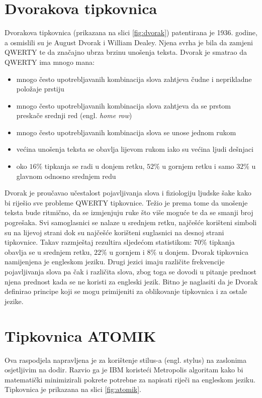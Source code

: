 \documentclass[times, utf8, zavrsni, numeric]{fer}
\begin{document}
\section{Dvorakova tipkovnica}
Dvorakova tipkovnica (prikazana na slici \ref{fig:dvorak}) patentirana je 1936. godine, a osmislili su je August Dvorak i William Dealey. Njena svrha je bila da zamjeni QWERTY te da značajno ubrza brzinu unošenja teksta. Dvorak je smatrao da QWERTY ima mnogo mana:

\begin{itemize}
\item mnogo često upotrebljavanih kombinacija slova zahtjeva čudne i neprikladne položaje prstiju
\item mnogo često upotrebljavanih kombinacija slova zahtjeva da se prstom preskače srednji red (engl. \emph{home row})
\item mnogo često upotrebljavanih kombinacija slova se unose jednom rukom
\item većina unošenja teksta se obavlja lijevom rukom iako su većina ljudi dešnjaci
\item oko $16\%$ tipkanja se radi u donjem retku, $52\%$ u gornjem retku i samo $32\%$ u glavnom odnosno srednjem redu
\end{itemize}

Dvorak je proučavao učestalost pojavljivanja slova i fiziologiju ljudske šake kako bi riješio sve probleme QWERTY tipkovnice. Težio je prema tome da unošenje teksta bude ritmično, da se izmjenjuju ruke što više moguće te da se smanji broj pogrešaka. Svi samoglasnici se nalaze u srednjem retku, najčešće korišteni simboli su na lijevoj strani dok su najčešće korišteni suglasnici na desnoj strani tipkovnice. Takav razmještaj rezultira sljedećom statistikom: $70\%$ tipkanja obavlja se u srednjem retku, $22\%$ u gornjem i $8\%$ u donjem.  Dvorak tipkovnica namijenjena je engleskom jeziku. Drugi jezici imaju različite frekvencije pojavljivanja slova pa čak i različita slova, zbog toga se dovodi u pitanje prednost njena prednost kada se ne koristi za engleski jezik. Bitno je naglasiti da je Dvorak definirao principe koji se mogu primijeniti za oblikovanje tipkovnica i za ostale jezike.

\section{Tipkovnica ATOMIK}
Ova raspodjela napravljena je za korištenje stilus-a (engl. stylus) na zaslonima osjetljivim na dodir. Razvio ga je IBM koristeći Metropolis algoritam kako bi matematički minimizirali pokrete potrebne za napisati riječi na engleskom jeziku. Tipkovnica je prikazana na slici \ref{fig:atomik}.
\end{document}
